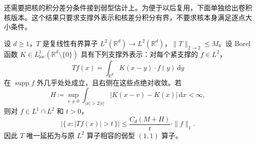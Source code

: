 还需要把核的积分差分条件接到弱型估计上。为便于以后复用，下面单独给出卷积核版本。这个结果只要求支撑外表示和核差分积分有界，不要求核本身满足逐点大小条件。

\begin{lemma}\label{b2:lem:22-integral-hormander-weak}
设 \(d\geq1\)，\(T\) 是复线性有界算子 \(L^2(\mathbb R^d)\to L^2(\mathbb R^d)\)，\(\|T\|_{2\to2}\leq M\)。设 Borel 函数 \(K\in L^1_{\mathrm{loc}}(\mathbb R^d\setminus\{0\})\) 具有下列支撑外表示：对每个紧支撑的 \(f\in L^2\)，
\[
 Tf(x)=\int_{\mathbb R^d}K(x-y)\cdot f(y)\,\mathrm dy
\]
在 \(\operatorname{supp}f\) 外几乎处处成立，且右侧在这些点绝对收敛。若
\[
 H\coloneqq\sup_{v\ne0}
 \int_{|x|>2|v|}|K(x-v)-K(x)|\,\mathrm dx<\infty,
\]
则对 \(f\in L^1\cap L^2\) 和 \(t>0\)，
\[
 \bigl|\{\,x:|Tf(x)|>t\,\}\bigr|
 \leq \frac{C_d(M+H)}{t}\cdot\|f\|_1.
\]
因此 \(T\) 唯一延拓为与原 \(L^2\) 算子相容的弱型 \((1,1)\) 算子。
\end{lemma}
